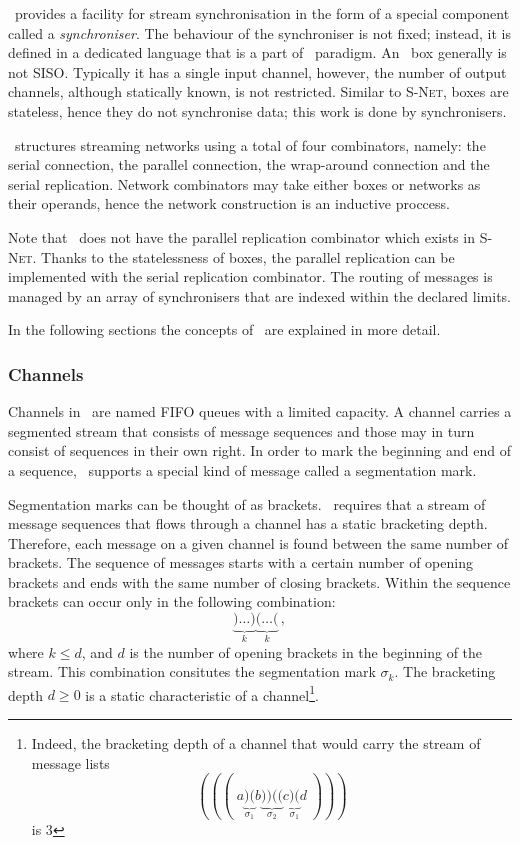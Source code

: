 \ak\ provides a facility for stream synchronisation in the form of a special component called a \emph{synchroniser}. The behaviour of the synchroniser is not fixed; instead, it is defined in a dedicated language that is a part of \ak\ paradigm. An \ak\ box generally is not SISO. Typically it has a single input channel, however, the number of output channels, although statically known, is not restricted. Similar to \textsc{S-Net}, boxes are stateless, hence they do not synchronise data; this work is done by synchronisers.

\ak\ structures streaming networks using a total of four combinators, namely: the serial connection, the parallel connection, the wrap-around connection and the serial replication. Network combinators may take either boxes or networks as their operands, hence the network construction is an inductive proccess. 

Note that \ak\ does not have the parallel replication combinator which exists in \textsc{S-Net}. Thanks to the statelessness of boxes, the parallel replication can be implemented with the serial replication combinator. The routing of messages is managed by an array of synchronisers that are indexed within the declared limits.

In the following sections the concepts of \ak\ are explained in more detail.


    \subsubsection{Channels}
Channels in \ak\ are named FIFO queues with a limited capacity. A channel carries a segmented stream that consists of message sequences and those may in turn consist of sequences in their own right. In order to mark the beginning and end of a sequence, \ak\ supports a special kind of message called a segmentation mark.

Segmentation marks can be thought of as brackets. \ak\ requires that a stream of message sequences that flows through a channel has a static bracketing depth. Therefore, each message on a given channel is found between the same number of brackets. The sequence of messages starts with a certain number of opening brackets and ends with the same number of closing brackets. Within the sequence brackets can occur only in the following combination:
\[
\underbrace{)\ldots)}_k \underbrace{(\ldots(}_k\,,
\]
where $k \le d$, and $d$ is the number of opening brackets in the beginning of the stream. This combination consitutes the segmentation mark $\sigma_k$. The bracketing depth $d \ge 0$ is a static characteristic of a channel\footnote{Indeed, the bracketing depth of a channel that would carry the stream of message lists
\[
(((\;a\underbrace{)(}_{\sigma_1}b\underbrace{))((}_{\sigma_2}c\underbrace{)(}_{\sigma_1}d\;)))
\]
is 3}.


